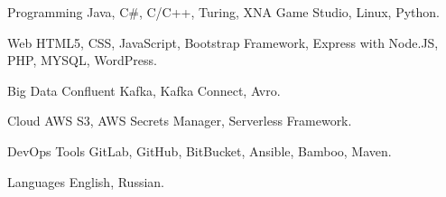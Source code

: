 \vspace{-1.75mm}


\begin{cvskills}


\cvskill
{Programming} %
{Java, C\#, C/C++, Turing, XNA Game Studio, Linux, Python.} %


\cvskill
{Web} %
{HTML5, CSS, JavaScript, Bootstrap Framework, Express with Node.JS, PHP, MYSQL, WordPress.} %


\cvskill
{Big Data} %
{Confluent Kafka, Kafka Connect, Avro.} %

\cvskill
{Cloud} %
{AWS S3, AWS Secrets Manager, Serverless Framework.} %


\cvskill
{DevOps Tools} %
{GitLab, GitHub, BitBucket, Ansible, Bamboo, Maven.} %

\cvskill
{Languages} %
{English, Russian.} %


\end{cvskills}